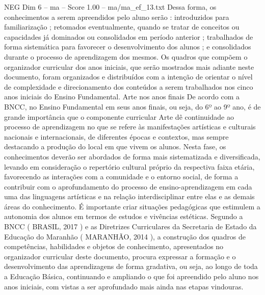 \begin{textsample}{NEG Dim 6 – ma – Score 1.00 – ma/ma\_ef\_13.txt}
Dessa forma, os conhecimentos a serem apreendidos pelo aluno serão : introduzidos para familiarização ; retomados eventualmente, quando se tratar de conceitos ou capacidades já dominados ou consolidados em período anterior ; trabalhados de forma sistemática para favorecer o desenvolvimento dos alunos ; e consolidados durante o processo de aprendizagem dos mesmos.
Os quadros que compõem o organizador curricular dos anos iniciais, que serão mostrados mais adiante neste documento, foram organizados e distribuídos com a intenção de orientar o nível de complexidade e direcionamento dos conteúdos a serem trabalhados nos cinco anos iniciais do Ensino Fundamental.
Arte nos anos finais De acordo com a BNCC, no Ensino Fundamental em seus anos finais, ou seja, do 6º ao 9º ano, é de grande importância que o componente curricular Arte dê continuidade ao processo de aprendizagem no que se refere às manifestações artísticas e culturais nacionais e internacionais, de diferentes épocas e contextos, mas sempre destacando a produção do local em que vivem os alunos.
Nesta fase, os conhecimentos deverão ser abordados de forma mais sistematizada e diversificada, levando em consideração o repertório cultural próprio da respectiva faixa etária, favorecendo as interações com a comunidade e o entorno social, de forma a contribuir com o aprofundamento do processo de ensino-aprendizagem em cada uma das linguagens artísticas e na relação interdisciplinar entre elas e as demais áreas do conhecimento.
É importante criar situações pedagógicas que estimulem a autonomia dos alunos em termos de estudos e vivências estéticas.
Segundo a BNCC ( BRASIL, 2017 ) e as Diretrizes Curriculares da Secretaria de Estado da Educação do Maranhão ( MARANHÃO, 2014 ), a construção dos quadros de competências, habilidades e objetos de conhecimento, apresentados no organizador curricular deste documento, procura expressar a formação e o desenvolvimento das aprendizagens de forma gradativa, ou seja, ao longo de toda a Educação Básica, continuando e ampliando o que foi apreendido pelo aluno nos anos iniciais, com vistas a ser aprofundado mais ainda nas etapas vindouras.

\end{textsample}
